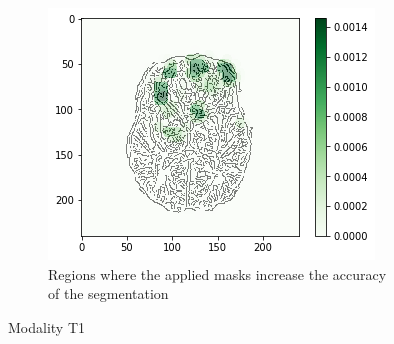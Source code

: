 \begin{figure}[H]
    \begin{subfigure}[t]{.45\textwidth}
        \centering
        \includegraphics[width=\linewidth]{chapters/06_hdm/c_Brats18_2013_17_1_L1/44.png}
        \caption{Regions where the applied masks increase the accuracy of the segmentation}
    \end{subfigure}
    \caption{Modality T1}
\end{figure}

